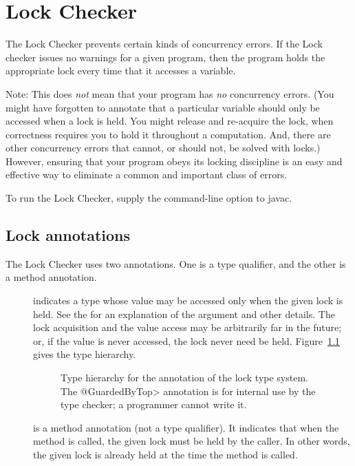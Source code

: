 \htmlhr
\chapter{Lock Checker\label{lock-checker}}

The Lock Checker prevents certain kinds of concurrency errors.  If the Lock
checker issues no warnings for a given program, then the program holds the
appropriate lock every time that it accesses a variable.

Note:  This does \emph{not} mean that your program has \emph{no} concurrency
errors.  (You might have forgotten to annotate that a particular variable
should only be accessed when a lock is held.  You might release and
re-acquire the lock, when correctness requires you to hold it throughout a
computation.  And, there are other concurrency errors that cannot, or
should not, be solved with locks.)  However, ensuring that your
program obeys its locking discipline is an easy and effective way to
eliminate a common and important class of errors.


To run the Lock Checker, supply the
command-line option to javac.


\section{Lock annotations\label{lock-annotations}}

The Lock Checker uses two annotations.  One is a type qualifier, and the
other is a method annotation.

\begin{description}

\item[]
  indicates a type whose value may be accessed only when the given lock is
  held.
  See the  for an explanation of the argument and other details.  The lock
  acquisition and the value access may be arbitrarily far in the future;
  or, if the value is never accessed, the lock never need be held.
  Figure~\ref{fig-guardedby-hierarchy} gives the type hierarchy.

\begin{figure}
\caption{Type hierarchy for the  annotation of the lock
  type system.  The \<@GuardedByTop> annotation is for internal use by the
  type checker; a programmer cannot write it.}
\label{fig-guardedby-hierarchy}
\end{figure}


\item[]
  is a method annotation (not a type qualifier).  It indicates that when
  the method is called, the given lock must be held by the caller.
  In other words, the given lock is already held at the time the method is
  called.

\end{description}

